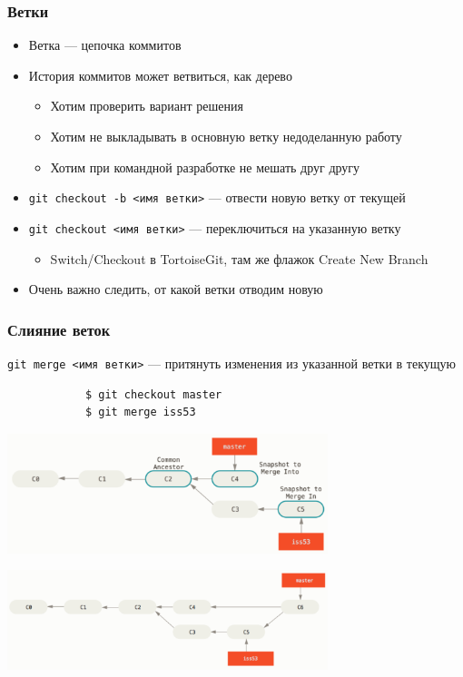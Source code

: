 \documentclass{../../slides-style}
\begin{document}
    \begin{frame}[fragile]
        \frametitle{Ветки}
        \begin{itemize}
            \item Ветка --- цепочка коммитов
            \item История коммитов может ветвиться, как дерево
            \begin{itemize}
                \item Хотим проверить вариант решения
                \item Хотим не выкладывать в основную ветку недоделанную работу
                \item Хотим при командной разработке не мешать друг другу
            \end{itemize}
            \item \verb|git checkout -b <имя ветки>| --- отвести новую ветку от текущей
            \item \verb|git checkout <имя ветки>| --- переключиться на указанную ветку
            \begin{itemize}
                \item Switch/Checkout в TortoiseGit, там же флажок Create New Branch
            \end{itemize}
            \item Очень важно следить, от какой ветки отводим новую
        \end{itemize}
    \end{frame}

    \begin{frame}[fragile]
        \frametitle{Слияние веток}
        \verb|git merge <имя ветки>| --- притянуть изменения из указанной ветки в текущую
        \begin{verbatim}
            $ git checkout master
            $ git merge iss53
        \end{verbatim}
        \begin{center}
            \includegraphics[width=0.7\textwidth]{merge.png}
        \end{center}
        \begin{center}
            \includegraphics[width=0.7\textwidth]{mergeResult.png}
        \end{center}
    \end{frame}
\end{document}

